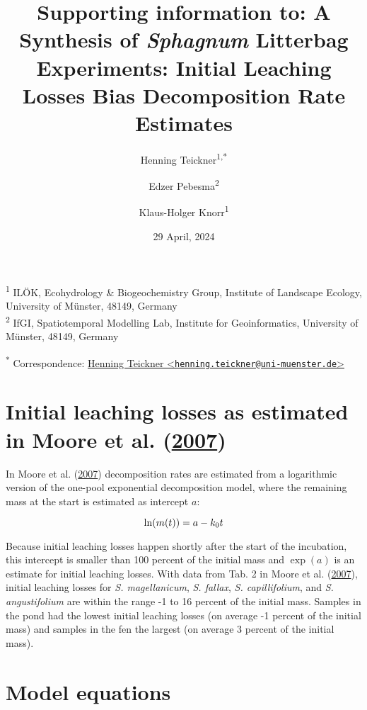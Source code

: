 \documentclass[
  12pt,
]{article}
\title{Supporting information to: A Synthesis of \emph{Sphagnum} Litterbag Experiments: Initial Leaching Losses Bias Decomposition Rate Estimates}
\author{Henning Teickner\textsuperscript{1,*} \and Edzer Pebesma\textsuperscript{2} \and Klaus-Holger Knorr\textsuperscript{1}}
\date{29 April, 2024}
\begin{document}
\maketitle

{
\setcounter{tocdepth}{2}
\tableofcontents
}
\textsuperscript{1} ILÖK, Ecohydrology \& Biogeochemistry Group, Institute of Landscape Ecology, University of Münster, 48149, Germany\\
\textsuperscript{2} IfGI, Spatiotemporal Modelling Lab, Institute for Geoinformatics, University of Münster, 48149, Germany

\textsuperscript{*} Correspondence: \href{mailto:henning.teickner@uni-muenster.de}{Henning Teickner \textless{}\href{mailto:henning.teickner@uni-muenster.de}{\nolinkurl{henning.teickner@uni-muenster.de}}\textgreater{}}

\hypertarget{sup-1}{%
\section{\texorpdfstring{Initial leaching losses as estimated in Moore et al. (\protect\hyperlink{ref-Moore.2007}{2007})}{Initial leaching losses as estimated in Moore et al. (2007)}}\label{sup-1}}

In Moore et al. (\protect\hyperlink{ref-Moore.2007}{2007}) decomposition rates are estimated from a logarithmic version of the one-pool exponential decomposition model, where the remaining mass at the start is estimated as intercept \(a\):

\[
\ln(m(t)) = a - k_0t\\
\]

Because initial leaching losses happen shortly after the start of the incubation, this intercept is smaller than 100 percent of the initial mass and \(\exp(a)\) is an estimate for initial leaching losses. With data from Tab. 2 in Moore et al. (\protect\hyperlink{ref-Moore.2007}{2007}), initial leaching losses for \emph{S. magellanicum}, \emph{S. fallax}, \emph{S. capillifolium}, and \emph{S. angustifolium} are within the range -1 to 16 percent of the initial mass. Samples in the pond had the lowest initial leaching losses (on average -1 percent of the initial mass) and samples in the fen the largest (on average 3 percent of the initial mass).

\hypertarget{sup-13}{%
\section{Model equations}\label{sup-13}}
\end{document}
